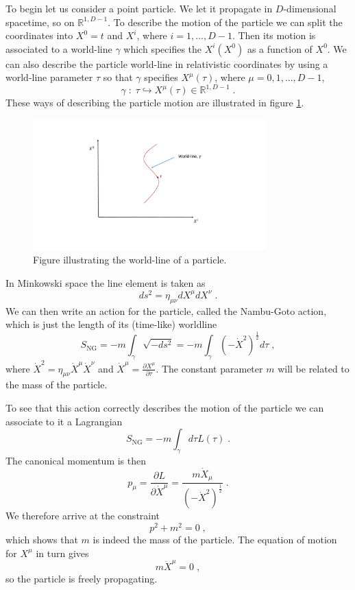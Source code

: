 \documentclass[11pt,a4paper]{article}
\numberwithin{equation}{section}
\numberwithin{table}{section}\setlength{\multlinegap}{25pt}
\newcommand{\be}{\begin{equation}}
\newcommand{\ee}{\end{equation}}
\newcommand{\half}{\frac{1}{2}}
\begin{document}
To begin let us consider a point particle. We let it propagate in $D$-dimensional spacetime, so on $\mathbb{R}^{1,D-1}$. To describe the motion of the particle we can split the coordinates into $X^0=t$ and $X^i$, where $i=1,...,D-1$. Then its motion is associated to a world-line $\gamma$ which specifies the $X^i\left(X^0\right)$ as a function of $X^0$. We can also describe the particle world-line in relativistic coordinates by using a world-line parameter $\tau$ so that $\gamma$ specifies $X^{\mu}\left(\tau\right)$, where $\mu=0,1,...,D-1$,
\be
\gamma \;:\; \tau \hookrightarrow X^{\mu}\left(\tau\right) \in \mathbb{R}^{1,D-1} \;.
\ee
These ways of describing the particle motion are illustrated in figure \ref{fig:pwl}. 
\begin{figure}[t]
\centering
 \includegraphics[width=0.8\textwidth]{Fig1.pdf}
\caption{Figure illustrating the world-line of a particle.}
\label{fig:pwl}
\end{figure}


In Minkowski space the line element is taken as
\be
ds^2 = \eta_{\mu\nu} dX^{\mu} dX^{\nu} \;.
\ee
We can then write an action for the particle, called the Nambu-Goto action, which is just the length of its (time-like) worldline
\be
S_{\mathrm{NG}} = - m \int_{\gamma} \sqrt{-ds^2} = - m  \int_{\gamma}\left(-\dot X^2 \right)^{\frac12} d\tau \;,
\ee
where $\dot X^2 = \eta_{\mu\nu} \dot X^{\mu} \dot X^{\nu}$ and $\dot X^{\mu} = \frac{\partial X^{\mu}}{\partial \tau}$. The constant parameter $m$ will be related to the mass of the particle.

To see that this action correctly describes the motion of the particle we can associate to it a Lagrangian
\be
S_{\mathrm{NG}} = - m \int_{\gamma} d \tau L\left( \tau \right) \;.
\ee
The canonical momentum is then
\be
p_{\mu} = \frac{\partial L}{\partial \dot X^{\mu}} = \frac{m \dot X_{\mu}}{\left(-\dot X^2 \right)^{\half}} \;.
\ee
We therefore arrive at the constraint
\be
p^2 + m^2 = 0 \;,
\ee
which shows that $m$ is indeed the mass of the particle. The equation of motion for $X^{\mu}$ in turn gives
\be
m \ddot X^{\mu} = 0 \;,
\ee
so the particle is freely propagating.
\end{document}
